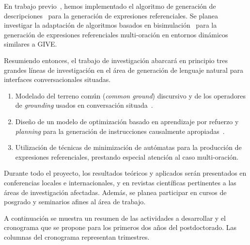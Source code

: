 \documentclass[10.9pt,a4paper]{article}
\begin{document}
En trabajo previo~\citep{racc:ENLG11}, hemos implementado el 
algoritmo de generaci\'on de descripciones~\citep{dale95} para la 
generaci\'on de expresiones referenciales. Se planea investigar la 
adaptaci\'on de algoritmos basados en 
bisimulaci\'on~\citep{arec:refe08,arec:usin11,altamirano-areces-benotti:2012:POSTERS} para la generaci\'on de 
expresiones referenciales multi-oraci\'on en entornos din\'amicos similares 
a GIVE.

Resumiendo entonces, el trabajo de investigaci\'on abarcar\'a en principio tres grandes l\'ineas 
de investigaci\'on en el \'area de generaci\'on de lenguaje natural para interfaces conversacionales 
situadas.
\begin{enumerate}

    \item Modelado del terreno com\'un (\emph{common ground}) 
    discursivo y de los operadores de \emph{grounding} usados en 
    conversaci\'on situada~\citep{benotti-EtAl:2012:ACL2012short}.

    \item Dise\~no de un modelo de optimizaci\'on basado en aprendizaje 
    por refuerzo y \emph{planning} para la generaci\'on de instrucciones 
    causalmente apropiadas~\citep{beno:acl11}.

    \item Utilizaci\'on de t\'ecnicas de minimizaci\'on de aut\'omatas para la 
    producci\'on de expresiones referenciales, prestando especial atenci\'on 
    al caso multi-oraci\'on.

\end{enumerate}

Durante todo el proyecto, los resultados te\'oricos y aplicados ser\'an 
presentados en conferencias locales e internacionales, y en revistas 
cient\'ificas pertinentes a las \'areas de investigaci\'on afectadas.
Adem\'as, se planea participar en cursos de posgrado y seminarios afines
al \'area de trabajo. 

A continuaci\'on se muestra un resumen de las actividades a desarrollar y 
el cronograma que se propone para los primeros dos a\~nos del postdoctorado.
Las columnas del cronograma representan trimestres.
\end{document}
